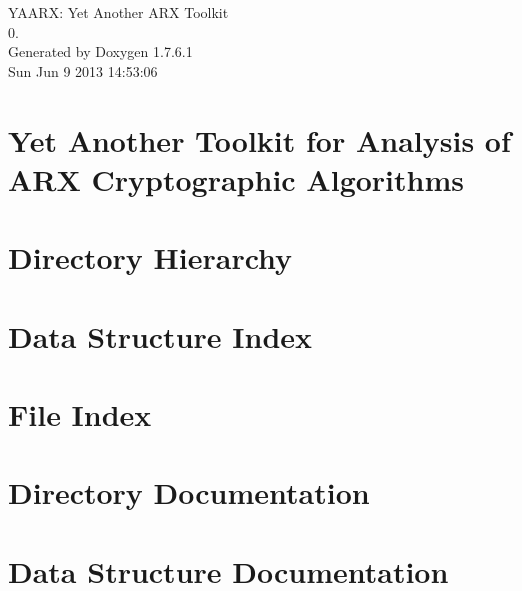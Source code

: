 \documentclass[a4paper]{article}
\begin{document}
\hypersetup{pageanchor=false,citecolor=blue}
\begin{titlepage}
\vspace*{7cm}
\begin{center}
{\Large \-Y\-A\-A\-R\-X\-: \-Yet \-Another \-A\-R\-X \-Toolkit \\[1ex]\large 0. }\\
\vspace*{1cm}
{\large \-Generated by Doxygen 1.7.6.1}\\
\vspace*{0.5cm}
{\small Sun Jun 9 2013 14:53:06}\\
\end{center}
\end{titlepage}
\tableofcontents
{}
\hypersetup{pageanchor=true,citecolor=blue}
\section{\-Yet \-Another \-Toolkit for \-Analysis of \-A\-R\-X \-Cryptographic \-Algorithms}
\label{index}\hypertarget{index}{}
\section{\-Directory \-Hierarchy}

\section{\-Data \-Structure \-Index}

\section{\-File \-Index}

\section{\-Directory \-Documentation}



\section{\-Data \-Structure \-Documentation}









\end{document}
